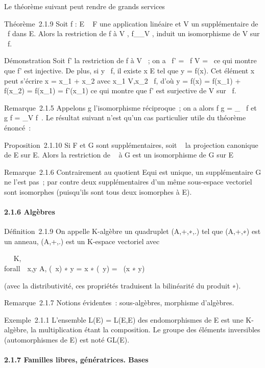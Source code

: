 Le théorème suivant peut rendre de grands services

Théorème~2.1.9 Soit f : E \rightarrow~ F une application linéaire et V un
supplémentaire de
\mathrmKer~f dans E. Alors
la restriction de f à V , f__V , induit un
isomorphisme de V sur
\mathrmIm~f.

Démonstration Soit f' la restriction de f à V ~; on a
\mathrmKer~f'
= \mathrmKer~f \bigcap V =
\0\ ce qui montre que f' est
injective. De plus, si y
\in\mathrmIm~f, il existe x \in
E tel que y = f(x). Cet élément x peut s'écrire x = x_1 +
x_2 avec x_1 \in V,x_2
\in\mathrmKer~f, d'où y = f(x)
= f(x_1) + f(x_2) = f(x_1) = f'(x_1)
ce qui montre que f' est surjective de V sur
\mathrmIm~f.

Remarque~2.1.5 Appelons g l'isomorphisme réciproque~; on a alors f \cdot g
=
\mathrmId_\mathrmIm~
f et g \cdot f = \pi_V
\parallel\mathrmKer f~. Le
résultat suivant n'est qu'un cas particulier utile du théorème énoncé~:

Proposition~2.1.10 Si F et G sont supplémentaires, soit \pi~ la projection
canonique de E sur E\diagupF. Alors la restriction de \pi~ à G est un
isomorphisme de G sur E\diagupF

Remarque~2.1.6 Contrairement au quotient E\diagupF qui est unique, un
supplémentaire G ne l'est pas~; par contre deux supplémentaires d'un
même sous-espace vectoriel sont isomorphes (puisqu'ils sont tous deux
isomorphes à E\diagupF).

\paragraph{2.1.6 Algèbres}

Définition~2.1.9 On appelle K-algèbre un quadruplet (A,+,∗,.) tel que
(A,+,∗) est un anneau, (A,+,.) est un K-espace vectoriel avec

\forall~\lambda~ \in K, \\forall~~x,y \in A,
(\lambda~x) ∗ y = x ∗ (\lambda~y) = \lambda~(x ∗ y)

(avec la distributivité, ces propriétés traduisent la bilinéarité du
produit ∗).

Remarque~2.1.7 Notions évidentes~: sous-algèbres, morphisme d'algèbres.

Exemple~2.1.1 L'ensemble L(E) = L(E,E) des endomorphismes de E est une
K-algèbre, la multiplication étant la composition. Le groupe des
éléments inversibles (automorphismes de E) est noté GL(E).

\paragraph{2.1.7 Familles libres, génératrices. Bases}

